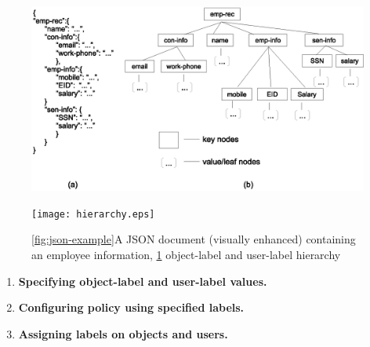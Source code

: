 \begin{figure}[t]
	\centering
	\label{fig:protection-model}
		
	\begin{minipage}{.5\textwidth}
		\centering
		\includegraphics[height=1.1\textwidth]{json-example.eps}
		\label{fig:json-example}
	\end{minipage}%
	\begin{minipage}{.5\textwidth}
			\centering
			\texttt{[image: hierarchy.eps]}
			\label{fig:hierarchy}
		\end{minipage}%
\caption{\ref{fig:json-example}A JSON document (visually enhanced) containing an employee information, \ref{fig:hierarchy} object-label and user-label hierarchy}
\end{figure}

\begin{enumerate}
	\item \textbf{Specifying object-label and user-label values.}
	\item \textbf{Configuring policy using specified labels.}
	\item \textbf{Assigning labels on objects and users.}
%	
%	
	\end{enumerate}
	
